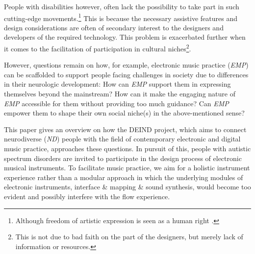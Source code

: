 \documentclass{chi-ext}
\begin{document}
\begin{multicols}{2}

People with disabilities however, often lack the possibility to take part in such cutting-edge movements.\footnote{Although freedom of artistic expression is seen as a human right \cite{shaheed2013-rep}.} 
This is because the necessary assistive features and design considerations are often of secondary interest to the designers and developers of the required technology. 
This problem is exacerbated further when it comes to the facilitation of participation in cultural niches\footnote{This is not due to bad faith on the part of the designers, but merely lack of information or resources.}.

However, questions remain on how, for example, electronic music practice (\emph{EMP}) can be scaffolded to support people facing challenges in society due to differences in their neurologic development:
How can \emph{EMP} support them in expressing themselves beyond the mainstream? 
How can it make the engaging nature of \emph{EMP} accessible for them without providing too much guidance?
Can \emph{EMP} empower them to shape their own social niche(s) in the above-mentioned sense?

This paper gives an overview on how the DEIND project, which aims to connect neurodiverse (\emph{ND}) people with the field of contemporary electronic and digital music practice, approaches these questions.
In pursuit of this, people with autistic spectrum disorders are invited to participate in the design process of electronic musical instruments. 
To facilitate music practice, we aim for a holistic instrument experience rather than a modular approach in which the underlying modules of electronic instruments, interface \& mapping \& sound synthesis, would become too evident and possibly interfere with the flow experience. 


\end{multicols}
\end{document}
